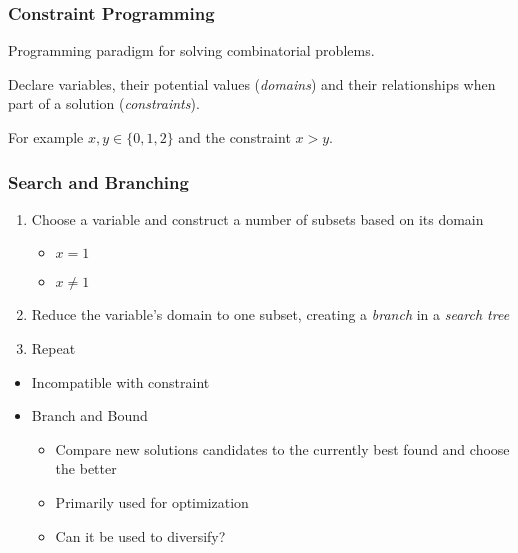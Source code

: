 \begin{frame}
	\frametitle{Constraint Programming}

	Programming paradigm for solving combinatorial problems.

	\vspace{0.5cm}

	Declare variables, their potential values (\textit{domains}) and their relationships when
	part of a solution (\textit{constraints}).

	\vspace{0.5cm}

	For example $x,y \in \{0,1,2\}$ and the constraint $x > y$.

\end{frame}

\begin{frame}
	\frametitle{Search and Branching}

	\begin{enumerate}
		\item Choose a variable and construct a number of subsets based on its domain
			\begin{itemize}
				\item $x = 1$
				\item $x \neq 1$
			\end{itemize}
		\item Reduce the variable's domain to one subset, creating a \textit{branch} in a \textit{search tree}
		\item Repeat
	\end{enumerate}

	\vspace{0.5cm}

	\begin{itemize}
		\item Incompatible with constraint
		\item Branch and Bound
			\begin{itemize}
				\item Compare new solutions candidates to the currently best found and choose the better
				\item Primarily used for optimization 
				\item Can it be used to diversify?
			\end{itemize}
	\end{itemize}

\end{frame}

